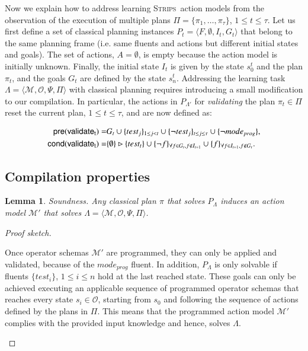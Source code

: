 \documentclass[3p,times]{elsarticle}
\newtheorem{mylemma}[mytheorem]{Lemma}
\newcommand{\pre}{\mathsf{pre}}  %
\newcommand{\cond}{\mathsf{cond}}   %
\newcommand{\strips}{\textsc{Strips}}     %
\newcommand{\tup}[1]{{\langle #1 \rangle}}
\begin{document}
Now we explain how to address learning \strips\ action models from the observation of the execution of multiple plans $\Pi=\{\pi_1,\ldots,\pi_{\tau}\}$, {\tt\small $1\leq t\leq \tau$}. Let us first define a set of classical planning instances $P_t=\tup{F,\emptyset,I_t,G_t}$ that belong to the same planning frame (i.e. same fluents and actions but different initial states and goals). The set of actions, $A=\emptyset$, is empty because the action model is initially unknown. Finally, the initial state $I_t$ is given by the state $s_0^t$ and the plan $\pi_t$, and the goals $G_t$ are defined by the state $s_n^t$. Addressing the learning task $\Lambda=\tup{\mathcal{M},\mathcal{O},\Psi,\Pi}$ with classical planning requires introducing a small modification to our compilation. In particular, the actions in $P_{\Lambda'}$ for {\em validating} the plan $\pi_t\in\Pi$ reset the current plan, {\tt\small $1\leq t\leq \tau$}, and are now defined as:
\begin{small}
\begin{align*}
\hspace*{7pt}\pre(\mathsf{validate_{t}})=&G_t\cup\{test_j\}_{1\leq j<t}\cup\{\neg test_j\}_{t\leq j\leq \tau}\cup \{\neg mode_{prog}\},\\
\cond(\mathsf{validate_{t}})=&\{\emptyset\}\rhd\{test_t\} \cup \{\neg f\}_{\forall f\in G_t, f \notin I_{t+1}}\cup \{f\}_{\forall f\in I_{t+1}, f \notin G_t}.
\end{align*}
\end{small}



\subsection{Compilation properties}

\begin{mylemma}
Soundness. Any classical plan $\pi$ that solves $P_{\Lambda}$ induces an action model $\mathcal{M}'$ that solves $\Lambda=\tup{\mathcal{M},\mathcal{O},\Psi,\Pi}$.
\end{mylemma}

\begin{proof}[Proof sketch]
\begin{small}
Once operator schemas $\mathcal{M}'$ are programmed, they can only be applied and validated, because of the $mode_{prog}$ fluent. In addition, $P_{\Lambda}$ is only solvable if fluents $\{test_i\}$, {\small $1\leq i\leq n$} hold at the last reached state. These goals can only be achieved executing an applicable sequence of programmed operator schemas that reaches every state $s_i\in\mathcal{O}$, starting from $s_0$ and following the sequence of actions defined by the plans in $\Pi$. This means that the programmed action model $\mathcal{M}'$ complies with the provided input knowledge and hence, solves $\Lambda$.
\end{small}
\end{proof}
\end{document}
